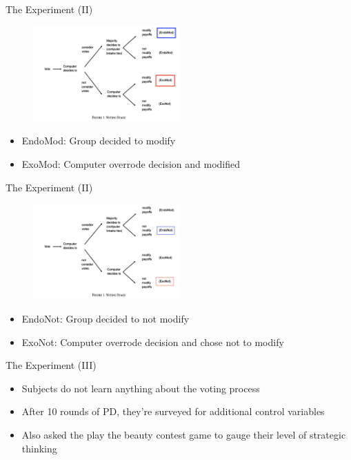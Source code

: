 \documentclass[11pt,notes=hide,aspectratio=169,mathserif]{beamer}
\begin{document}
\begin{frame}{The Experiment (II)}
\begin{figure}
\centering
\includegraphics[width=0.5\textwidth]{inputs/voting2.png}
\end{figure}
\begin{itemize}
    \pause \item EndoMod: Group decided to modify
    \pause \item ExoMod: Computer overrode decision and modified 
\end{itemize}
\end{frame}

\begin{frame}{The Experiment (II)}
\begin{figure}
\centering
\includegraphics[width=0.5\textwidth]{inputs/voting3.png}
\end{figure}
\begin{itemize}
    \pause \item EndoNot: Group decided to not modify
    \pause \item ExoNot: Computer overrode decision and chose not to modify 
\end{itemize}
\end{frame}

\begin{frame}{The Experiment (III)}
\begin{itemize}
    \item Subjects do not learn anything about the voting process
    \pause \item After 10 rounds of PD, they're surveyed for additional control variables 
    \pause \item Also asked the play the beauty contest game to gauge their level of strategic thinking
\end{itemize}
\end{frame}
\end{document}
